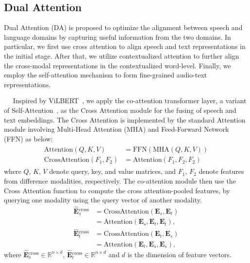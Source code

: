 \documentclass[11pt]{article}
\newcommand{\myparagraph}[1]{\vspace{2pt}\noindent{\bf{#1}}~~}
\begin{document}
\vspace{-0.3em}
\subsection{Dual Attention}
\vspace{-0.3em}
Dual Attention (DA) is proposed to optimize the alignment between speech and language domains by capturing useful information from the two domains. In particular, we first use cross attention to align speech and text representations in the initial stage. After that, we utilize contextualized attention to further align the cross-modal representations in the contextualized word-level. Finally, we employ the self-attention mechanism to form fine-grained audio-text representations.

\myparagraph{Cross Attention.}
Inspired by ViLBERT~\cite{lu2019vilbert}, we apply the co-attention transformer layer, a variant of Self-Attention~\cite{vaswani2017attention}, as the Cross Attention module for the fusing of speech and text embeddings. The Cross Attention is implemented by the standard Attention module involving Multi-Head Attention (MHA) and Feed-Forward Network (FFN) \cite{vaswani2017attention} as below:\begin{align}
\begin{split}
\text{Attention}(Q,K,V)&=\text{FFN}(\text{MHA}(Q,K,V))\\
\text{CrossAttention}(F_1,F_2)&=\text{Attention}(F_1,F_2,F_2)
\end{split}
\end{align}
where $Q$, $K$, $V$ denote query, key, and value matrices, and $F_1$, $F_2$ denote features from difference modalities, respectively. The co-attention module then use the Cross Attention function to compute the cross attention-pooled features, by querying one modality using the query vector of another modality.\begin{equation}
\begin{split}
\hat{ \textbf{E}}{_s^{\text{cross}}} &= \text{CrossAttention}(\textbf{E}_s,\textbf{E}_t) \\
&= \text{Attention}( \textbf{E}_s, \textbf{E}_t, \textbf{E}_t), \\
\hat{ \textbf{E}}{_t^{\text{cross}}} &= \text{CrossAttention}( \textbf{E}_t,\textbf{E}_s) \\
&=\text{Attention}( \textbf{E}_t, \textbf{E}_s, \textbf{E}_s),
\end{split}
\end{equation}
where $\hat{ \textbf{E}}{_s^{\text{cross}}} \in \mathbb{R}^{n\times d}$, $\hat{ \textbf{E}}{_t^{\text{cross}}} \in \mathbb{R}^{n\times d}$ and $d$ is the dimension of feature vectors.
\end{document}
